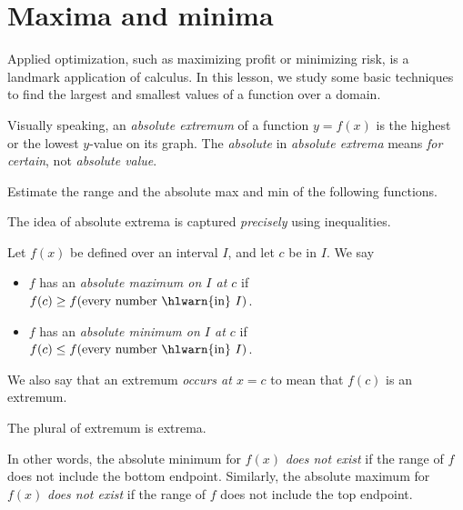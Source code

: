 \documentclass[../main.tex]{subfiles}
\begin{document}
 

\section{Maxima and minima}
Applied optimization, such as maximizing profit or minimizing risk, is a landmark application of calculus.  In this lesson, we study some basic techniques to find the largest and smallest values of a function over a domain.  

Visually speaking, an \emph{absolute extremum} of a function \(y = f(x)\) is the highest or the lowest  \(y\)-value on its graph.  The \emph{absolute} in \emph{absolute extrema} means \emph{for certain}, not \emph{absolute value}.

\begin{example}
  Estimate the range and the absolute max and min of the following functions.

  \begin{center}
    
    \qquad
    
    \qquad
    
  \end{center}
  \blanks*

  \begin{center}
    
    \qquad
    
    \qquad
    
  \end{center}
  \blanks*
\end{example}

The idea of absolute extrema is captured \emph{precisely} using inequalities.
\begin{definition}
  Let \(f(x)\) be defined over an interval \(I\), and let \(c\) be in \(I\). 
  We say
  \begin{itemize}
    \item \(f\) has an \emph{absolute maximum on \(I\) at \(c\)} if \(f(c) \ge f(\text{every number \hlwarn{in} } I)\).

    \item \(f\) has an \emph{absolute minimum on \(I\) at \(c\)} if \(f(c) \le f(\text{every number \hlwarn{in} } I)\).
  \end{itemize}
  
  We also say that an extremum \emph{occurs at \(x=c\)} to mean that \(f(c)\) is an extremum.
  
  The plural of extremum is extrema.

\end{definition}
\faExclamationTriangle{} In other words, the absolute minimum for \(f(x)\) \emph{does not exist} if the range of \(f\) does not include the bottom endpoint. Similarly, the absolute maximum for \(f(x)\) \emph{does not exist} if the range of \(f\) does not include the top endpoint.
\end{document}
